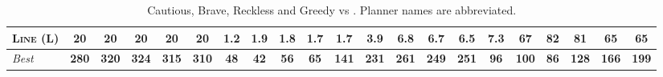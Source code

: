 \begin{table}[tb]
{\begin{tabular}{|l||ccccc||ccccc||ccccc||ccccc||}
\textsc{Line} (L)&\textbf{20}&\textbf{20}&\textbf{20}&\textbf{20}&\textbf{20}&\textbf{1.2}&1.9&1.8&1.7&1.7&\textbf{3.9}&6.8&6.7&6.5&7.3&67&82&81&\textbf{65}&\textbf{65}
\\\hline
\textit{Best}&\textbf{280}&\textbf{320}&\textbf{324}&\textbf{315}&\textbf{310}&\textbf{48}&\textbf{42}&\textbf{56}&\textbf{65}&\textbf{141}&\textbf{231}&\textbf{261}&\textbf{249}&\textbf{251}&\textbf{96}&\textbf{100}&\textbf{86}&\textbf{128}&\textbf{166}&\textbf{199}\\\hline

        \end{tabular}}
        \caption{Cautious, Brave, Reckless and Greedy \pattyd vs \pattyo. Planner names are abbreviated.}
        \label{tab:cbrg}
        \end{table}
        